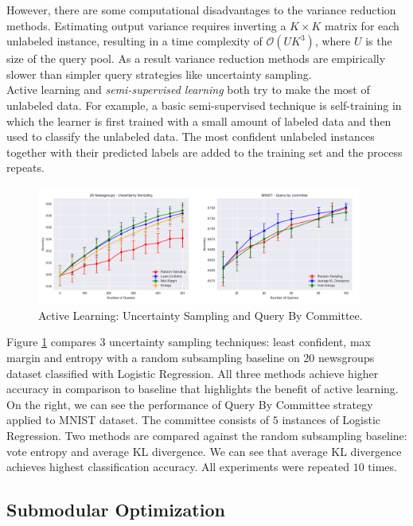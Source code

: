 However, there are some computational disadvantages to the variance reduction methods. Estimating output variance requires inverting a $K\times K$ matrix for each unlabeled instance, resulting in a time complexity of $\mathcal{O}(UK^{3})$, where $U$ is the size of the query pool. As a result variance reduction methods are empirically slower than simpler query strategies like uncertainty sampling.\\  

Active learning and \textit{semi-supervised learning} both try to make the most of unlabeled data. For example, a basic semi-supervised technique is self-training in which the learner is first trained with a small amount of labeled data and then used to classify the unlabeled data. The most confident unlabeled instances together with their predicted labels are added to the training set and the process repeats.\\ 

\begin{figure}[tbhp]
    \centering
    \includegraphics[width=0.95\textwidth, trim={10 10 10 10}]{figures/active_learning_merged.png}
    \caption{Active Learning: Uncertainty Sampling and Query By Committee.}
    \label{fig:al_merged}
\end{figure}

Figure \ref{fig:al_merged} compares $3$ uncertainty sampling techniques: least confident, max margin and entropy with a random subsampling baseline on 20 newsgroups dataset classified with Logistic Regression. All three methods achieve higher accuracy in comparison to baseline that highlights the benefit of active learning. On the right, we can see the performance of Query By Committee strategy applied to MNIST dataset. The committee consists of $5$ instances of Logistic Regression. Two methods are compared against the random subsampling baseline: vote entropy and average KL divergence. We can see that average KL divergence achieves highest classification accuracy. All experiments were repeated $10$ times.  


\subsection{Submodular Optimization}


